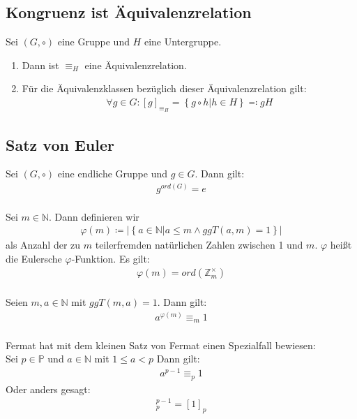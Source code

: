 \subsection{Kongruenz ist Äquivalenzrelation}
Sei $(G, \circ)$ eine Gruppe und $H$ eine Untergruppe.
\begin{enumerate}
    \item Dann ist $\equiv_H$ eine Äquivalenzrelation.
    \item Für die Äquivalenzklassen bezüglich dieser Äquivalenzrelation gilt:
    \begin{align*}
        \forall g\in G: [g]_{\equiv_{H}}=\left\{ g\circ h|h\in H\right\} \eqqcolon gH
    \end{align*}
\end{enumerate}

\subsection{Satz von Euler}
Sei $(G, \circ)$ eine endliche Gruppe und $g\in G$.
Dann gilt:
\begin{align*}
    g^{ord(G)}=e
\end{align*}
\\
Sei $m\in \mathbb{N}$.
Dann definieren wir
\begin{align*}
    \varphi(m)\coloneqq |\left\{ a\in \mathbb{N}|a\leq m \wedge ggT(a,m)=1 \right\}|
\end{align*}
als Anzahl der zu $m$ teilerfremden natürlichen Zahlen zwischen 1 und $m$.
$\varphi$ heißt die Eulersche $\varphi$-Funktion.
Es gilt:
\begin{align*}
    \varphi(m)=ord(\mathbb{Z}_m^{\times})
\end{align*}
\\
Seien $m, a\in\mathbb{N}$ mit $ggT(m,a)=1$.
Dann gilt:
\begin{align*}
    a^{\varphi(m)}\equiv_m 1
\end{align*}
\\
Fermat hat mit dem kleinen Satz von Fermat einen Spezialfall bewiesen:\\
Sei $p\in\mathbb{P}$ und $a\in\mathbb{N}$ mit $1\leq a<p$
Dann gilt:
\begin{align*}
    a^{p-1}\equiv_p 1
\end{align*}
Oder anders gesagt:
\begin{align*}
    [a]_p^{p-1}= [1]_p
\end{align*}
